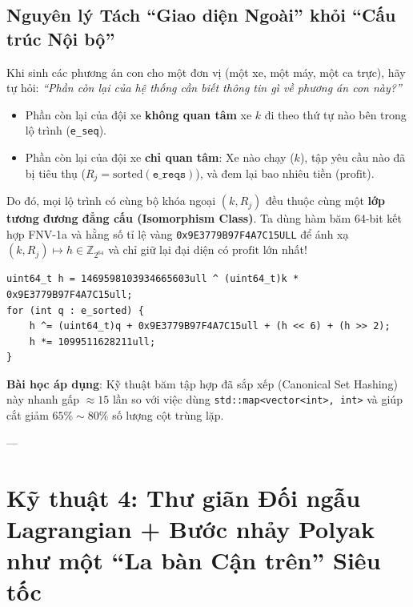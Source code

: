 \documentclass[11pt,a4paper]{article}
\begin{document}
\subsection{Nguyên lý Tách ``Giao diện Ngoài'' khỏi ``Cấu trúc Nội bộ''}
Khi sinh các phương án con cho một đơn vị (một xe, một máy, một ca trực), hãy tự hỏi: \textit{``Phần còn lại của hệ thống cần biết thông tin gì về phương án con này?''}
\begin{itemize}[leftmargin=1.5em]
    \item Phần còn lại của đội xe \textbf{không quan tâm} xe $k$ đi theo thứ tự nào bên trong lộ trình (\texttt{e\_seq}).
    \item Phần còn lại của đội xe \textbf{chỉ quan tâm}: Xe nào chạy ($k$), tập yêu cầu nào đã bị tiêu thụ ($R_j = \text{sorted}(\texttt{e\_reqs})$), và đem lại bao nhiêu tiền ($\text{profit}$).
\end{itemize}
Do đó, mọi lộ trình có cùng bộ khóa ngoại $(k, R_j)$ đều thuộc cùng một \textbf{lớp tương đương đẳng cấu (Isomorphism Class)}. Ta dùng hàm băm 64-bit kết hợp FNV-1a và hằng số tỉ lệ vàng \texttt{0x9E3779B97F4A7C15ULL} để ánh xạ $(k, R_j) \mapsto h \in \mathbb{Z}_{2^{64}}$ và chỉ giữ lại đại diện có $\text{profit}$ lớn nhất!

\begin{lstlisting}
uint64_t h = 1469598103934665603ull ^ (uint64_t)k * 0x9E3779B97F4A7C15ull;
for (int q : e_sorted) {
    h ^= (uint64_t)q + 0x9E3779B97F4A7C15ull + (h << 6) + (h >> 2);
    h *= 1099511628211ull;
}
\end{lstlisting}
\textbf{Bài học áp dụng}: Kỹ thuật băm tập hợp đã sắp xếp (Canonical Set Hashing) này nhanh gấp $\approx 15$ lần so với việc dùng \texttt{std::map<vector<int>, int>} và giúp cắt giảm $65\%\sim 80\%$ số lượng cột trùng lặp.

---

\section{Kỹ thuật 4: Thư giãn Đối ngẫu Lagrangian + Bước nhảy Polyak như một ``La bàn Cận trên'' Siêu tốc}
\end{document}
